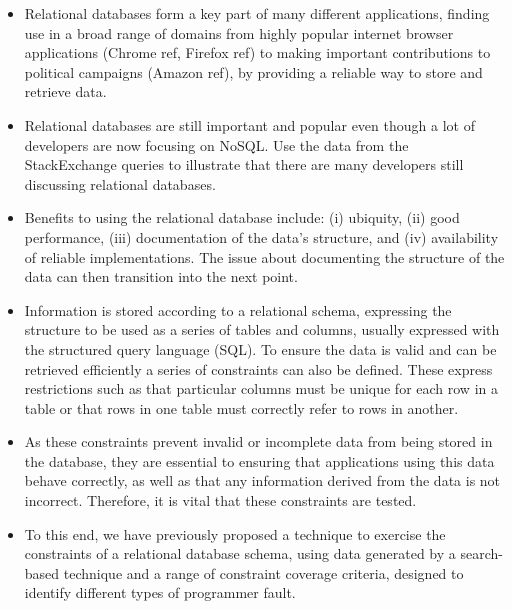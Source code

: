 \begin{itemize}

  \item Relational databases form a key part of many different applications, finding use in a broad range of domains from highly popular internet browser applications (Chrome ref, Firefox ref) to making important contributions to political campaigns (Amazon ref), by providing a reliable way to store and retrieve data.

  \item Relational databases are still important and popular even though a lot of developers are now focusing on NoSQL. Use the data from the StackExchange queries to illustrate that there are many developers still discussing relational databases.

  \item Benefits to using the relational database include: (i) ubiquity, (ii) good performance, (iii) documentation of the data's structure, and (iv) availability of reliable implementations. The issue about documenting the structure of the data can then transition into the next point.


  \item Information is stored according to a relational schema, expressing the structure to be used as a series of tables and columns, usually expressed with the structured query language (SQL). To ensure the data is valid and can be retrieved efficiently a series of constraints can also be defined. These express restrictions such as that particular columns must be unique for each row in a table or that rows in one table must correctly refer to rows in another.

  \item As these constraints prevent invalid or incomplete data from being stored in the database, they are essential to ensuring that applications using this data behave correctly, as well as that any information derived from the data is not incorrect. Therefore, it is vital that these constraints are tested.

  \item To this end, we have previously proposed a technique to exercise the constraints of a relational database schema, using data generated by a search-based technique and a range of constraint coverage criteria, designed to identify different types of programmer fault.


\end{itemize}
